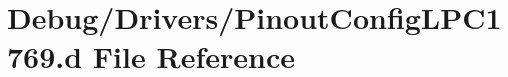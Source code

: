 \hypertarget{PinoutConfigLPC1769_8d}{}\section{Debug/\+Drivers/\+Pinout\+Config\+L\+P\+C1769.d File Reference}
\label{PinoutConfigLPC1769_8d}
